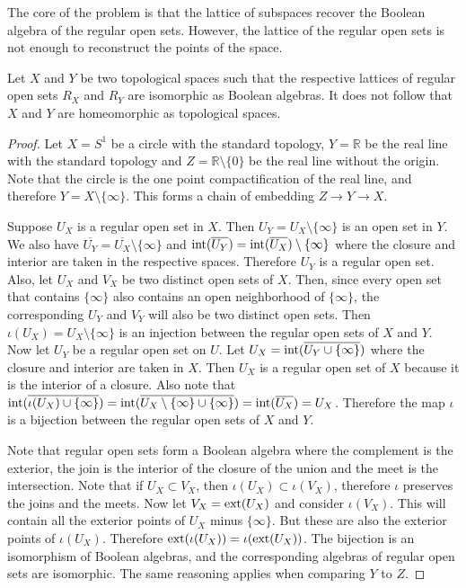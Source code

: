 The core of the problem is that the lattice of subspaces recover the Boolean algebra of the regular open sets. However, the lattice of the regular open sets is not enough to reconstruct the points of the space.

\begin{prop}\label{pm_es_regularOpenSetsNotEnough}
	Let $X$ and $Y$ be two topological spaces such that the respective lattices of regular open sets $R_X$ and $R_Y$ are isomorphic as Boolean algebras. It does not follow that $X$ and $Y$ are homeomorphic as topological spaces.
\end{prop}

\begin{proof}
	Let $X=S^1$ be a circle with the standard topology, $Y=\mathbb{R}$ be the real line with the standard topology and $Z=\mathbb{R}\setminus \{0\}$ be the real line without the origin. Note that the circle is the one point compactification of the real line, and therefore $Y=X\setminus \{\infty\}$. This forms a chain of embedding $Z \to Y \to X$.
	
	Suppose $U_X$ is a regular open set in $X$. Then $U_Y = U_X \setminus \{\infty\}$ is an open set in $Y$. We also have $\overline{U_Y} = \overline{U_X} \setminus \{\infty\}$ and $\operatorname{int}(\overline{U_Y}) = \operatorname{int}(\overline{U_X}) \setminus \{\infty\}$ where the closure and interior are taken in the respective spaces. Therefore $U_Y$ is a regular open set. Also, let $U_X$ and $V_X$ be two distinct open sets of $X$. Then, since every open set that contains $\{\infty\}$ also contains an open neighborhood of $\{\infty\}$, the corresponding $U_Y$ and $V_Y$ will also be two distinct open sets. Then $\iota(U_X) = U_X \setminus \{\infty\}$ is an injection between the regular open sets of $X$ and $Y$. Now let $U_Y$ be a regular open set on $U$. Let $U_X = \operatorname{int}(\overline{U_Y \cup \{ \infty \}})$ where the  closure and interior are taken in $X$. Then $U_X$ is a regular open set of $X$ because it is the interior of a closure. Also note that $\operatorname{int}(\overline{\iota(U_X) \cup \{ \infty \}}) = \operatorname{int}(\overline{U_X \setminus \{\infty\} \cup \{ \infty \}}) = \operatorname{int}(\overline{U_X}) = U_X$. Therefore the map $\iota$ is a bijection between the regular open sets of $X$ and $Y$.
	
	Note that regular open sets form a Boolean algebra where the complement is the exterior, the join is the interior of the closure of the union and the meet is the intersection. Note that if $U_X \subset V_X$, then $\iota(U_X) \subset \iota(V_X)$, therefore $\iota$ preserves the joins and the meets. Now let $V_X = \operatorname{ext}(U_X)$ and consider $\iota(V_X)$. This will contain all the exterior points of $U_X$ minus $\{\infty\}$. But these are also the exterior points of $\iota(U_X)$. Therefore $\operatorname{ext}(\iota(U_X)) = \iota(\operatorname{ext}(U_X))$. The bijection is an isomorphism of Boolean algebras, and the corresponding algebras of regular open sets are isomorphic. The same reasoning applies when comparing $Y$ to $Z$.
	

\end{proof}
